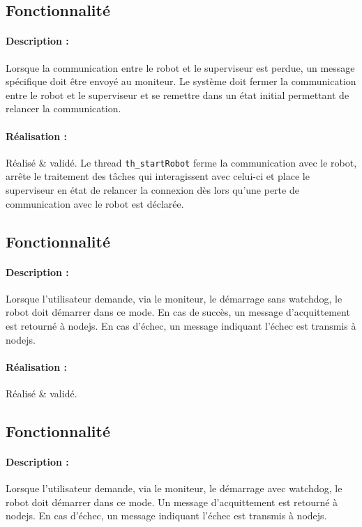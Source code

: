 \documentclass[11pt, a4paper]{paper}
\newcounter{cptreq}
\begin{document}
\subsection{Fonctionnalité \thecptreq}

\paragraph{Description :} Lorsque la communication entre le robot et le superviseur est perdue, un message spécifique doit être envoyé au moniteur. Le système doit fermer la communication entre le robot et le superviseur et se remettre dans un état initial permettant de relancer la communication.

\paragraph{\color{black}Réalisation :}  {\color{black} Réalisé \& validé. Le thread {\tt th\_startRobot} ferme la communication avec le robot, arrête le traitement des tâches qui interagissent avec celui-ci et place le superviseur en état de relancer la connexion dès lors qu'une perte de communication avec le robot est déclarée.}


\subsection{Fonctionnalité \thecptreq}

\paragraph{Description :} Lorsque l'utilisateur demande, via le moniteur, le démarrage sans watchdog, le robot doit démarrer dans ce mode. En cas de succès, un message d'acquittement est retourné à nodejs. En cas d'échec, un message indiquant l'échec est transmis à nodejs.

\paragraph{\color{black}Réalisation :}  {\color{black} Réalisé \& validé.}

\subsection{Fonctionnalité \thecptreq}

\paragraph{Description :} Lorsque l'utilisateur demande, via le moniteur, le démarrage avec watchdog, le robot doit démarrer dans ce mode. Un message d'acquittement est retourné à nodejs. En cas d'échec, un message indiquant l'échec est transmis à nodejs.
\end{document}
